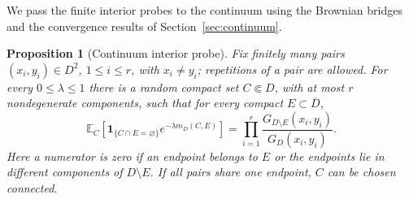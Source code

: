 \documentclass[11pt]{article}
\numberwithin{equation}{section}
\newcommand{\E}{\mathbb{E}}
\newcommand{\1}{\mathbf{1}}
\newtheorem{proposition}[theorem]{Proposition}
\newcommand\ol[1]{\overline{#1}}
\newcommand{\one}{\mathbf 1}
\begin{document}
We pass the finite interior probes to the continuum using the Brownian bridges and the convergence results of Section~\ref{sec:continuum}.

\begin{proposition}[Continuum interior probe]
\label{prop:sec5-continuum-probe}
Fix finitely many pairs
\((x_i,y_i)\in D^2\), \(1\leq i\leq r\), with \(x_i\ne y_i\);
repetitions of a pair are allowed.  For every
\(0\leq\lambda\leq1\) there is a random compact set \(C\Subset D\), with
at most \(r\) nondegenerate components, such that for every compact
\(E\subset\ol D\),
\begin{equation}\label{eq:sec5-continuum-transform}
 \E_C\!\left[
 \one_{\{C\cap E=\varnothing\}}e^{-\lambda m_D(C,E)}\right]
 =\prod_{i=1}^r
   \frac{G_{D\setminus E}(x_i,y_i)}{G_D(x_i,y_i)}.
\end{equation}
Here a numerator is zero if an endpoint belongs to \(E\) or the endpoints
 lie in different components of \(D\setminus E\).
If all pairs share one endpoint, \(C\) can be chosen connected.
\end{proposition}
\end{document}
